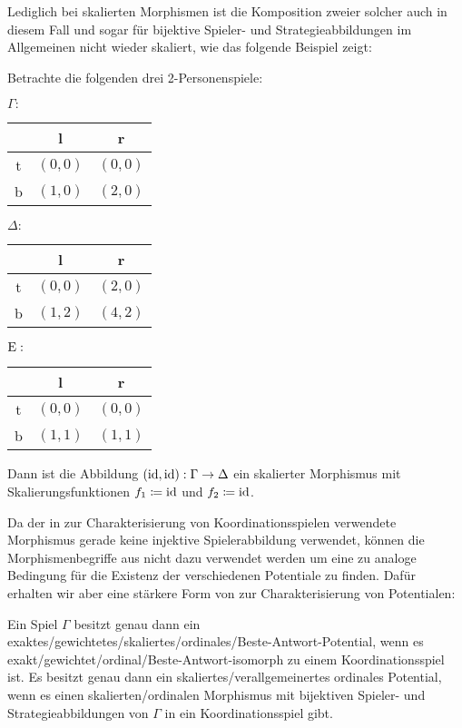 Lediglich bei skalierten Morphismen ist die Komposition zweier solcher auch in diesem Fall und sogar für bijektive Spieler- und Strategieabbildungen im Allgemeinen nicht wieder skaliert, wie das folgende Beispiel zeigt:

\begin{bsp}\label{bsp:GegenbspKompositionSkMorphismen}
	Betrachte die folgenden drei 2-Personenspiele:
	\begin{center}
		$\Gamma:$ \quad
		\begin{tabular}{c||c|c}
			& l 		& r 		\\\hline\hline
		t	& $(0,0)$	& $(0,0)$	\\\hline
		b	& $(1,0)$	& $(2,0)$ 
		\end{tabular}\hspace{3em}
		$\Delta:$ \quad
		\begin{tabular}{c||c|c}
			& l 		& r 		\\\hline\hline
		t	& $(0,0)$	& $(2,0)$	\\\hline
		b	& $(1,2)$	& $(4,2)$ 
		\end{tabular}\hspace{3em}
		$\mathrm{E}:$ \quad
		\begin{tabular}{c||c|c}
			& l 		& r 		\\\hline\hline
		t	& $(0,0)$	& $(0,0)$	\\\hline
		b	& $(1,1)$	& $(1,1)$ 
		\end{tabular}
	\end{center}
	Dann ist die Abbildung $(\mathrm{id}, \mathrm{id}): \Gamma \to \Delta$ ein skalierter Morphismus mit Skalierungsfunktionen $f_1 \coloneqq \mathrm{id}$ und $f_2 \coloneqq \mathrm{id}$.
\end{bsp}


Da der in  zur Charakterisierung von Koordinationsspielen verwendete Morphismus gerade keine injektive Spielerabbildung verwendet, können die Morphismenbegriffe aus  nicht dazu verwendet werden um eine zu  analoge Bedingung für die Existenz der verschiedenen Potentiale zu finden. Dafür erhalten wir aber eine stärkere Form von  zur Charakterisierung von Potentialen:

\begin{prop}\label{prop:CharPotentialeDurchIsos}
	Ein Spiel $\Gamma$ besitzt genau dann ein exaktes/gewichtetes/skaliertes/ordinales/Beste-Antwort-Potential, wenn es exakt/gewichtet/ordinal/Beste-Antwort-isomorph zu einem Koordinationsspiel ist. Es besitzt genau dann ein skaliertes/verallgemeinertes ordinales Potential, wenn es einen skalierten/ordinalen Morphismus mit bijektiven Spieler- und Strategieabbildungen von $\Gamma$ in ein Koordinationsspiel gibt.
\end{prop}

